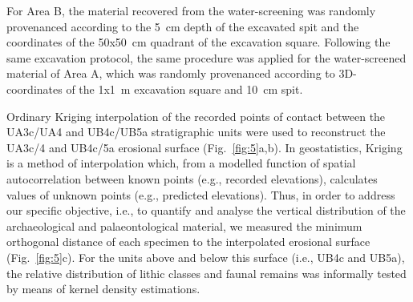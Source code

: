 \documentclass[preprint,authoryear,times]{elsarticle} %
\begin{document}
\begin{table}[]
  \caption{List of sampled observations for the vertical distribution and point pattern analyses.}
  \label{tab:2}
  \vspace{0.1in}
\end{table}

For Area B, the material recovered from the water-screening was randomly provenanced according to the 5~cm depth of the excavated spit and the coordinates of the 50x50~cm quadrant of the excavation square. Following the same excavation protocol, the same procedure was applied for the water-screened material of Area A, which was randomly provenanced according to 3D-coordinates of the 1x1~m excavation square and 10~cm spit.

Ordinary Kriging interpolation of the recorded points of contact between the UA3c/UA4 and UB4c/UB5a stratigraphic units were used to reconstruct the UA3c/4 and UB4c/5a erosional surface (Fig.~\ref{fig:5}a,b). In geostatistics, Kriging is a method of interpolation which, from a modelled function of spatial autocorrelation between known points (e.g., recorded elevations), calculates values of unknown points (e.g., predicted elevations). Thus, in order to address our specific objective, i.e., to quantify and analyse the vertical distribution of the archaeological and palaeontological material, we measured the minimum orthogonal distance of each specimen to the interpolated erosional surface (Fig.~\ref{fig:5}c). For the units above and below this surface (i.e., UB4c and UB5a), the relative distribution of lithic classes and faunal remains was informally tested by means of kernel density estimations.
\end{document}
